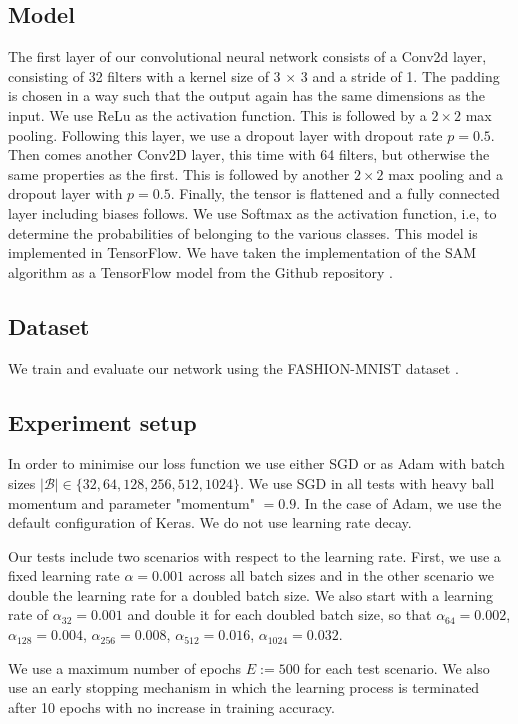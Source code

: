 \documentclass[10pt,conference,compsocconf]{IEEEtran}
\begin{document}
\subsection{Model}
The first layer of our convolutional neural network consists of a Conv2d layer, consisting of 32 filters with a kernel size of 3 $\times$ 3 and a stride of 1. The padding is chosen in a way such that the output again has the same dimensions as the input. 
We use ReLu as the activation function. 
This is followed by a $2 \times 2$ max pooling. 
Following this layer, we use a dropout layer with dropout rate $p = 0.5$.
Then comes another Conv2D layer, this time with 64 filters, but otherwise the same properties as the first. 
This is followed by another $2 \times 2$ max pooling and a dropout layer with $p = 0.5$. 
Finally, the tensor is flattened and a fully connected layer including biases follows. We use Softmax as the activation function, i.e, to determine the probabilities of belonging to the various classes. 
This model is implemented in TensorFlow. 
We have taken the implementation of the SAM algorithm as a TensorFlow model from the Github repository \cite{sam-keras}. 

\subsection{Dataset}
We train and evaluate our network using the FASHION-MNIST 
dataset \cite{fashion-mnist}. 

\subsection{Experiment setup}
In order to minimise our loss function we use either SGD or as Adam \cite{kingma2017adam} with batch sizes $|\mathcal{B}| \in \{32, 64, 128, 256, 512, 1024\}$. We use SGD in all tests with heavy ball momentum and parameter "momentum" $= 0.9$.
In the case of Adam, we use the default configuration of Keras.  
We do not use learning rate decay.

Our tests include two scenarios with respect to the learning rate. First, we use a fixed learning rate $\alpha = 0.001$ across all batch sizes and in the other scenario we double the learning rate for a doubled batch size. We also start with a learning rate of $\alpha_{32} = 0.001$ and double it for each doubled batch size, so that $\alpha_{64} = 0.002$, $\alpha_{128} = 0.004$, $\alpha_{256} = 0.008$, $\alpha_{512} = 0.016$, $\alpha_{1024} = 0.032$.

We use a maximum number of epochs $E := 500$ for each test scenario. We also use an early stopping mechanism in which the learning process is terminated after 10 epochs with no increase in training accuracy. 
\end{document}
